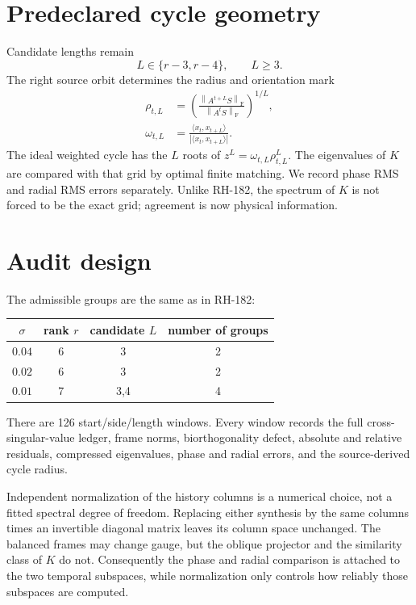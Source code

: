 \documentclass[12pt]{article}
\theoremstyle{remark}
\newcommand{\norm}[1]{\left\lVert#1\right\rVert}
\begin{document}
\section{Predeclared cycle geometry}

Candidate lengths remain
\begin{equation}\label{eq:lengths}
 L\in\{r-3,r-4\},\qquad L\ge3.
\end{equation}
The right source orbit determines the radius and orientation mark
\begin{align}
 \rho_{t,L}
 &=\left(\frac{\norm{A^{t+L}S}_{\mathrm F}}
 {\norm{A^tS}_{\mathrm F}}\right)^{1/L},
 \label{eq:radius}\\
 \omega_{t,L}
 &=\frac{\langle x_t,x_{t+L}\rangle}
 {|\langle x_t,x_{t+L}\rangle|}.
 \label{eq:mark}
\end{align}
The ideal weighted cycle has the $L$ roots of
$z^L=\omega_{t,L}\rho_{t,L}^L$.  The eigenvalues of $K$ are compared with
that grid by optimal finite matching.  We record phase RMS and radial RMS
errors separately.  Unlike RH-182, the spectrum of $K$ is not forced to be
the exact grid; agreement is now physical information.

\section{Audit design}

The admissible groups are the same as in RH-182:
\begin{center}
\begin{tabular}{cccc}
\toprule
$\sigma$ & rank $r$ & candidate $L$ & number of groups\\
\midrule
$0.04$ & 6 & 3 & 2\\
$0.02$ & 6 & 3 & 2\\
$0.01$ & 7 & 3,4 & 4\\
\bottomrule
\end{tabular}
\end{center}
There are 126 start/side/length windows.  Every window records the full
cross-singular-value ledger, frame norms, biorthogonality defect, absolute
and relative residuals, compressed eigenvalues, phase and radial errors, and
the source-derived cycle radius.

Independent normalization of the history columns is a numerical choice,
not a fitted spectral degree of freedom.  Replacing either synthesis by the
same columns times an invertible diagonal matrix leaves its column space
unchanged.  The balanced frames may change gauge, but the oblique projector
and the similarity class of $K$ do not.  Consequently the phase and radial
comparison is attached to the two temporal subspaces, while normalization
only controls how reliably those subspaces are computed.
\end{document}
